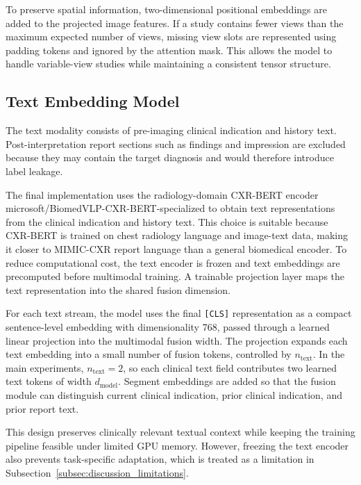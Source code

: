 To preserve spatial information, two-dimensional positional embeddings are added to the projected image features. If a study contains fewer views than the maximum expected number of views, missing view slots are represented using padding tokens and ignored by the attention mask. This allows the model to handle variable-view studies while maintaining a consistent tensor structure.

\subsection{Text Embedding Model}
\label{subsec:text_embedding_model}

The text modality consists of pre-imaging clinical indication and history text. Post-interpretation report sections such as findings and impression are excluded because they may contain the target diagnosis and would therefore introduce label leakage.

The final implementation uses the radiology-domain CXR-BERT encoder microsoft/BiomedVLP-CXR-BERT-specialized to obtain text representations from the clinical indication and history text. This choice is suitable because CXR-BERT is trained on chest radiology language and image-text data, making it closer to MIMIC-CXR report language than a general biomedical encoder. To reduce computational cost, the text encoder is frozen and text embeddings are precomputed before multimodal training. A trainable projection layer maps the text representation into the shared fusion dimension.

For each text stream, the model uses the final \texttt{[CLS]} representation as a compact sentence-level embedding with dimensionality 768, passed through a learned linear projection into the multimodal fusion width. The projection expands each text embedding into a small number of fusion tokens, controlled by \(n_{\text{text}}\). In the main experiments, \(n_{\text{text}}=2\), so each clinical text field contributes two learned text tokens of width \(d_{\text{model}}\). Segment embeddings are added so that the fusion module can distinguish current clinical indication, prior clinical indication, and prior report text.

This design preserves clinically relevant textual context while keeping the training pipeline feasible under limited GPU memory. However, freezing the text encoder also prevents task-specific adaptation, which is treated as a limitation in Subsection~\ref{subsec:discussion_limitations}.

